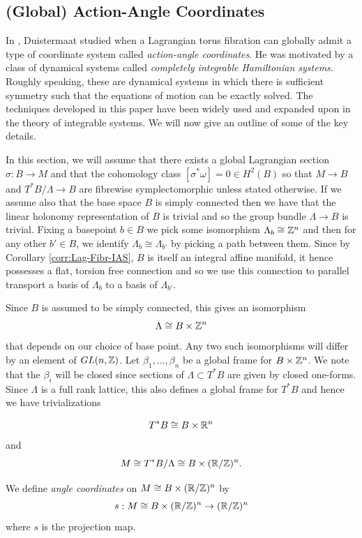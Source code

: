 \subsection{(Global) Action-Angle Coordinates}
In \cite{ActionAngle}, Duistermaat studied when a Lagrangian torus fibration
can globally admit a type of coordinate system called \emph{action-angle
    coordinates}. He was motivated by a class of dynamical systems called
\emph{completely integrable Hamiltonian systems}. Roughly speaking, these are
dynamical systems in which there is sufficient symmetry such that the equations
of motion can be exactly solved. The techniques developed in this paper have
been widely used and expanded upon in the theory of integrable systems. We will
now give an outline of some of the key details.

In this section, we will assume that there exists a global Lagrangian section
$\sigma: B \to M$ and that the cohomology class $[\sigma^*\omega] =0 \in
    H^2(B)$ so that $M\to B$ and $T^*B/\Lambda \to B$ are fibrewise
symplectomorphic unless stated otherwise. If we assume also that the base space
$B$ is simply connected then we have that the linear holonomy representation of
$B$ is trivial and so the group bundle $\Lambda \to B$ is trivial. Fixing a
basepoint $b\in B$ we pick some isomorphism $\Lambda_b \cong \mathbb{Z}^n$ and then for
any other $b'\in B$, we identify $\Lambda_b \cong \Lambda_{b'}$ by picking a
path between them. Since by Corollary \ref{corr:Lag-Fibr-IAS}, $B$ is itself an
integral affine manifold, it hence possesses a flat, torsion free connection
and so we use this connection to parallel transport a basis of $\Lambda_b $ to
a basis of $\Lambda_{b'}$.

Since $B$ is assumed to be simply connected, this gives an isomorphism $$
    \Lambda \cong B \times \mathbb{Z}^n $$ that depends on our choice of base point. Any
two such isomorphisms will differ by an element of $GL(n, \mathbb{Z})$. Let $\beta_1,
    \dots, \beta_n$ be a global frame for $B \times \mathbb{Z}^n$. We note that the
$\beta_i$ will be closed since sections of $\Lambda \subset T^*B$ are given by
closed one-forms. Since $\Lambda$ is a full rank lattice, this also defines a
global frame for $T^*B$ and hence we have trivializations

$$
    T^*B \cong B \times \mathbb{R}^n
$$
and
$$
    M \cong T^*B/\Lambda \cong B \times (\mathbb{R}/\mathbb{Z})^n.
$$

\begin{definition}
    We define \emph{angle coordinates} on $M \cong B \times (\mathbb{R}/\mathbb{Z})^n$ by
    $$
        s : M \cong B \times (\mathbb{R}/\mathbb{Z})^n \to (\mathbb{R}/\mathbb{Z})^n
    $$
    where $s$ is the projection map.
\end{definition}

